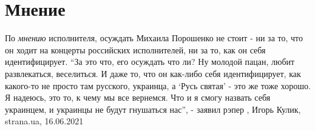  
 
 
 
 

\chapter{Мнение}

По \emph{мнению} исполнителя, осуждать Михаила Порошенко не стоит - ни за то,
что он ходит на концерты российских исполнителей, ни за то, как он себя
идентифицирует.  \enquote{За это что, его осуждать что ли? Ну молодой пацан,
любит развлекаться, веселиться. И даже то, что он как-либо себя идентифицирует,
как какого-то не просто там русского, украинца, а \enquote{Русь святая} - это
же тоже хорошо. Я надеюсь, это то, к чему мы все вернемся. Что и я смогу
назвать себя украинцем, и украинцы не будут гнушаться нас}, - заявил рэпер
, 
Игорь Кулик, strana.ua, 16.06.2021

